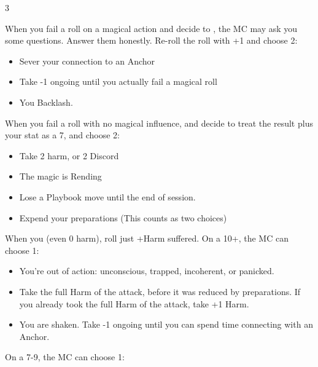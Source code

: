 



\begin{multicols}{3}
  \begin{move}
    When you fail a roll on a magical action and decide to , the MC may ask you some questions. Answer them honestly. Re-roll the roll with +1 and choose 2:

    \begin{itemize}
      \setlength\itemsep{0em}
    \item Sever your connection to an Anchor
    \item Take -1 ongoing until you actually fail a magical roll
    \item You Backlash.
    \end{itemize}

  \end{move}

  \SEPARATOR

  \begin{move}
    When you fail a roll with no magical influence, and decide to  treat the result plus your stat as a 7, and choose 2:

    \begin{itemize}
      \setlength\itemsep{0em}
    \item Take 2 harm, or 2 Discord
    \item The magic is Rending
    \item Lose a Playbook move until the end of session.
    \item Expend your preparations (This counts as two choices)
    \end{itemize}

  \end{move}

  \SEPARATOR

  \begin{move}
    When you  (even 0 harm), roll just +Harm suffered. On a 10+, the MC can choose 1:

    \begin{itemize}
      \setlength\itemsep{0em}
    \item You’re out of action: unconscious, trapped, incoherent, or panicked.
    \item Take the full Harm of the attack, before it was reduced by preparations. If you already took the full Harm of the attack, take +1 Harm.
    \item You are shaken. Take -1 ongoing until you can spend time connecting with an Anchor. 
    \end{itemize}
On a 7-9, the MC can choose 1:


\end{move}
\end{multicols}

